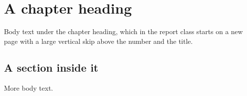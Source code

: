 \documentclass[11pt]{report}
\begin{document}
\chapter{A chapter heading}

Body text under the chapter heading, which in the report class starts on a new
page with a large vertical skip above the number and the title.

\section{A section inside it}

More body text.
\end{document}
